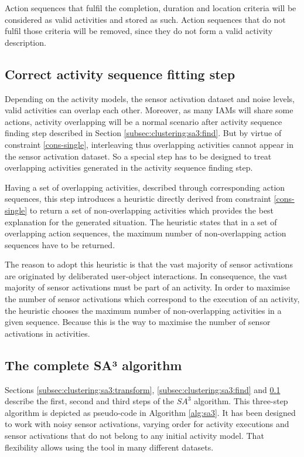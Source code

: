 Action sequences that fulfil the completion, duration and location criteria will be considered as valid activities and stored as such. Action sequences that do not fulfil those criteria will be removed, since they do not form a valid activity description.  

\subsection{Correct activity sequence fitting step}
\label{subsec:clustering:sa3:fit}
Depending on the activity models, the sensor activation dataset and noise levels, valid activities can overlap each other. Moreover, as many IAMs will share some actions, activity overlapping will be a normal scenario after activity sequence finding step described in Section \ref{subsec:clustering:sa3:find}. But by virtue of constraint \ref{cons-single}, interleaving thus overlapping activities cannot appear in the sensor activation dataset. So a special step has to be designed to treat overlapping activities generated in the activity sequence finding step. 

Having a set of overlapping activities, described through corresponding action sequences, this step introduces a heuristic directly derived from constraint \ref{cons-single} to return a set of non-overlapping activities which provides the best explanation for the generated situation. The heuristic states that in a set of overlapping action sequences, the maximum number of non-overlapping action sequences have to be returned. 

The reason to adopt this heuristic is that the vast majority of sensor activations are originated by deliberated user-object interactions. In consequence, the vast majority of sensor activations must be part of an activity. In order to maximise the number of sensor activations which correspond to the execution of an activity, the heuristic chooses the maximum number of non-overlapping activities in a given sequence. Because this is the way to maximise the number of sensor activations in activities.
 

\subsection{The complete SA³ algorithm}
\label{subsec:clustering:sa3:complete}

Sections \ref{subsec:clustering:sa3:transform}, \ref{subsec:clustering:sa3:find} and \ref{subsec:clustering:sa3:fit} describe the first, second and third steps of the $SA^3$ algorithm. This three-step algorithm is depicted as pseudo-code in Algorithm \ref{alg:sa3}. It has been designed to work with noisy sensor activations, varying order for activity executions and sensor activations that do not belong to any initial activity model. That flexibility allows using the tool in many different datasets. 

